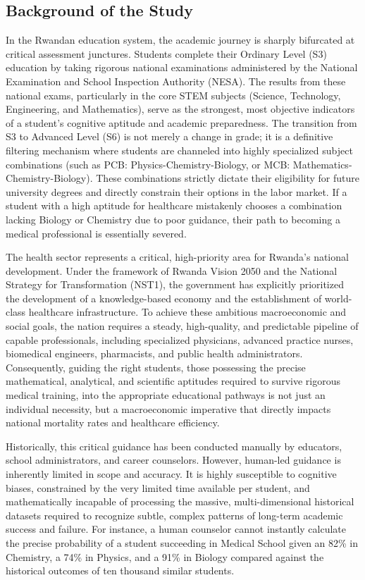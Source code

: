 \subsection{Background of the Study}

In the Rwandan education system, the academic journey is sharply bifurcated at critical assessment junctures. Students complete their Ordinary Level (S3) education by taking rigorous national examinations administered by the National Examination and School Inspection Authority (NESA). The results from these national exams, particularly in the core STEM subjects (Science, Technology, Engineering, and Mathematics), serve as the strongest, most objective indicators of a student's cognitive aptitude and academic preparedness. The transition from S3 to Advanced Level (S6) is not merely a change in grade; it is a definitive filtering mechanism where students are channeled into highly specialized subject combinations (such as PCB: Physics-Chemistry-Biology, or MCB: Mathematics-Chemistry-Biology). These combinations strictly dictate their eligibility for future university degrees and directly constrain their options in the labor market. If a student with a high aptitude for healthcare mistakenly chooses a combination lacking Biology or Chemistry due to poor guidance, their path to becoming a medical professional is essentially severed.

The health sector represents a critical, high-priority area for Rwanda's national development. Under the framework of Rwanda Vision 2050 and the National Strategy for Transformation (NST1), the government has explicitly prioritized the development of a knowledge-based economy and the establishment of world-class healthcare infrastructure. To achieve these ambitious macroeconomic and social goals, the nation requires a steady, high-quality, and predictable pipeline of capable professionals, including specialized physicians, advanced practice nurses, biomedical engineers, pharmacists, and public health administrators. Consequently, guiding the right students, those possessing the precise mathematical, analytical, and scientific aptitudes required to survive rigorous medical training, into the appropriate educational pathways is not just an individual necessity, but a macroeconomic imperative that directly impacts national mortality rates and healthcare efficiency.

Historically, this critical guidance has been conducted manually by educators, school administrators, and career counselors. However, human-led guidance is inherently limited in scope and accuracy. It is highly susceptible to cognitive biases, constrained by the very limited time available per student, and mathematically incapable of processing the massive, multi-dimensional historical datasets required to recognize subtle, complex patterns of long-term academic success and failure. For instance, a human counselor cannot instantly calculate the precise probability of a student succeeding in Medical School given an 82\% in Chemistry, a 74\% in Physics, and a 91\% in Biology compared against the historical outcomes of ten thousand similar students. 

